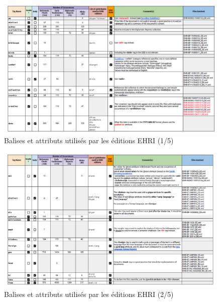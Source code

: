 
\label{Tableau}

\begin{figure}[ht]
    \centering
    \includegraphics[width=1\linewidth]{3-ANNEXES/images/encodage-ehri-1.png}
    \caption{Balises et attributs utilisés par les éditions EHRI (1/5)}
    \label{fig:TableauRecap1}
\end{figure}  

\begin{figure}[ht]
    \centering
    \includegraphics[width=1\linewidth]{3-ANNEXES/images/encodage-ehri-2.png}
    \caption{Balises et attributs utilisés par les éditions EHRI (2/5)}
    \label{fig:TableauRecap2}
\end{figure}  

